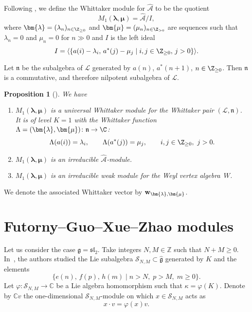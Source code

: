 \documentclass[pdftex]{sigma}
\numberwithin{equation}{section}
\newtheorem{Proposition}[Theorem]{Proposition}
\theoremstyle{definition}
\newcommand{\1}{\textbf{1}}
\begin{document}
 Following \cite{ALPY},
we define the Whittaker module for $\widehat{\mathcal{A}}$ to be the quotient \[M_1(\bm{\lambda}, \bm{\mu}) = \widehat{\mathcal{A}}/I,\]
 where $\bm{\lambda} = (\lambda_n)_{n \in {\Z}_{\ge 0}} $ and $\bm{\mu} = (\mu_n) _{n \in {\Z}_{>0}} $ are sequences such that $ \lambda_n=0$ and $\mu_n=0$ for $n \gg 0$ and $I$ is the left ideal
\[ I = \langle \{ a(i) - \lambda_i,\, a^{*}(j)-\mu_j \mid i,j \in {\Z}_{\ge 0},\, j >0\} \rangle.\]

 Let $\mathfrak n$ be the subalgebra of $\mathcal L$ generated by $a(n)$, $a^*(n+1)$, $n \in {\Z}_{\ge 0}$.
 Then $\mathfrak n$ is a commutative, and therefore nilpotent subalgebra of $\mathcal L$.

\begin{Proposition}[\cite{ALPY}] \label{standard} We have
\begin{enumerate}\itemsep=0pt
\item[$1.$] $M_1( \bm{ \lambda}, \bm{ \mu}) $ is a universal Whittaker module for the Whittaker pair $(\mathcal L, \mathfrak n)$. It is of level $K=1$ with the
Whittaker function $\Lambda = (\bm{\lambda}, \bm{\mu}) \colon \mathfrak n \rightarrow {\C}$:
\[
\Lambda(a(i)) = \lambda_i, \qquad \Lambda(a^*(j)) = \mu_j, \qquad i,j \in {\Z}_{\ge 0},\ j>0.
\]
\item[$2.$] $M_1( \bm{ \lambda}, \bm{ \mu}) $ is an irreducible $\widehat{\mathcal A}$-module.
\item[$3.$] $M_1( \bm{ \lambda}, \bm{ \mu}) $ is an irreducible weak module for the Weyl vertex algebra~$W$.
\end{enumerate}
\end{Proposition}

We denote the associated Whittaker vector by ${\bf w}_{ \bm{ \lambda}, \bm{ \mu} }$.

\section[Futorny--Guo--Xue--Zhao modules \protect{[17]}]{Futorny--Guo--Xue--Zhao modules \cite{FGXZ}}
\label{FGXZ-approach}

Let us consider the case $\mathfrak{g} = \mathfrak{sl}_{2}$.
Take integers $N, M \in \mathbb{Z}$ such that $N + M \ge 0$.
In~\cite{FGXZ}, the authors studied the Lie subalgebra
$\mathcal{S}_{N,M} \subset \widehat{\mathfrak{g}}$ generated by $K$ and the elements
\[
 \{ e(n),\, f(p),\, h(m) \mid n > N,\; p > M,\; m \ge 0 \}.
\]
Let $\varphi \colon \mathcal{S}_{N,M} \to \mathbb{C}$ be a Lie algebra homomorphism such that $\kappa = \varphi(K)$.
Denote by $\mathbb{C}v$ the one-dimensional $\mathcal{S}_{N,M}$-module on which $x \in \mathcal{S}_{N,M}$ acts as
\[
 x \cdot v = \varphi(x) v.
\]
\end{document}
